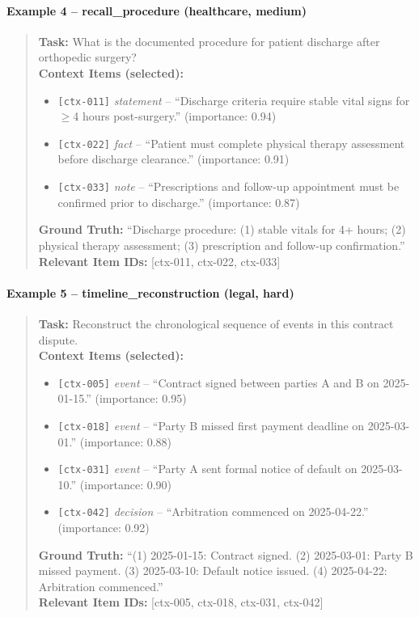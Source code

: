 \paragraph{Example 4 -- recall\_procedure (healthcare, medium)}
\begin{quote}
\small
\textbf{Task:} What is the documented procedure for patient discharge after orthopedic surgery?\\[2pt]
\textbf{Context Items (selected):}
\begin{itemize}
  \item \texttt{[ctx-011]} \textit{statement} -- ``Discharge criteria require stable vital signs for $\geq$4 hours post-surgery.'' (importance: 0.94)
  \item \texttt{[ctx-022]} \textit{fact} -- ``Patient must complete physical therapy assessment before discharge clearance.'' (importance: 0.91)
  \item \texttt{[ctx-033]} \textit{note} -- ``Prescriptions and follow-up appointment must be confirmed prior to discharge.'' (importance: 0.87)
\end{itemize}
\textbf{Ground Truth:} ``Discharge procedure: (1) stable vitals for 4+ hours; (2) physical therapy assessment; (3) prescription and follow-up confirmation.''\\[2pt]
\textbf{Relevant Item IDs:} [ctx-011, ctx-022, ctx-033]
\end{quote}

\paragraph{Example 5 -- timeline\_reconstruction (legal, hard)}
\begin{quote}
\small
\textbf{Task:} Reconstruct the chronological sequence of events in this contract dispute.\\[2pt]
\textbf{Context Items (selected):}
\begin{itemize}
  \item \texttt{[ctx-005]} \textit{event} -- ``Contract signed between parties A and B on 2025-01-15.'' (importance: 0.95)
  \item \texttt{[ctx-018]} \textit{event} -- ``Party B missed first payment deadline on 2025-03-01.'' (importance: 0.88)
  \item \texttt{[ctx-031]} \textit{event} -- ``Party A sent formal notice of default on 2025-03-10.'' (importance: 0.90)
  \item \texttt{[ctx-042]} \textit{decision} -- ``Arbitration commenced on 2025-04-22.'' (importance: 0.92)
\end{itemize}
\textbf{Ground Truth:} ``(1) 2025-01-15: Contract signed. (2) 2025-03-01: Party B missed payment. (3) 2025-03-10: Default notice issued. (4) 2025-04-22: Arbitration commenced.''\\[2pt]
\textbf{Relevant Item IDs:} [ctx-005, ctx-018, ctx-031, ctx-042]
\end{quote}

